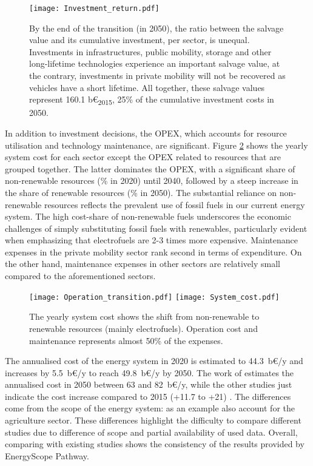 \begin{figure}[!htbp]
\centering
\texttt{[image: Investment\_return.pdf]}
\caption{By the end of the transition (\ie in 2050), the ratio between the salvage value and its cumulative investment, per sector, is unequal. Investments in infrastructures, public mobility, storage and other long-lifetime technologies experience an important salvage value, at the contrary, investments in private mobility will not be recovered as vehicles have a short lifetime. All together, these salvage values represent 160.1 b€\textsubscript{2015}, 25\% of the cumulative investment costs in 2050.}
\label{fig:pestd_inv_return}
\end{figure}

In addition to investment decisions, the \acrfull{OPEX}, which accounts for resource utilisation and technology maintenance, are significant. Figure \ref{fig:pestd_cumul_op} shows the yearly system cost for each sector except the \gls{OPEX} related to resources that are grouped together. The latter dominates the \gls{OPEX}, with a significant share of non-renewable resources (\% in 2020) until 2040, followed by a steep increase in the share of renewable resources (\% in 2050). The substantial reliance on non-renewable resources reflects the prevalent use of fossil fuels in our current energy system. The high cost-share of non-renewable fuels underscores the economic challenges of simply substituting fossil fuels with renewables, particularly evident when emphasizing that electrofuels are 2-3 times more expensive. Maintenance expenses in the private mobility sector rank second in terms of expenditure. On the other hand, maintenance expenses in other sectors are relatively small compared to the aforementioned sectors.

\begin{figure}[!htbp] %
\centering
\texttt{[image: Operation\_transition.pdf]}
\texttt{[image: System\_cost.pdf]}
\caption{The yearly system cost shows the shift from non-renewable to renewable resources (mainly electrofuels). Operation cost and maintenance represents almost 50\% of the expenses.}
\label{fig:pestd_cumul_op}
\end{figure}

The annualised cost of the energy system in 2020 is estimated to 44.3~b€/y and increases by 5.5~b€/y to reach 49.8~b€/y by 2050. The work of \citet{My2050} estimates the annualised cost in 2050 between 63 and 82~b€/y, while the other studies just indicate the cost increase compared to 2015 (+11.7 to +21) \citep{Devogelaer2013,PATHS2050}. The differences come from the scope of the energy system: as an example \citet{My2050} also account for the agriculture sector. These differences highlight the difficulty to compare different studies due to difference of scope and partial availability of used data. Overall, comparing with existing studies shows the consistency of the results provided by EnergyScope Pathway.

